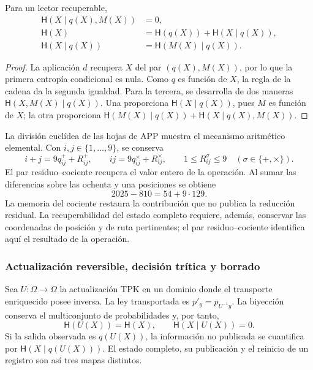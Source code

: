 \begin{proposition}
Para un lector recuperable,
\begin{align}
 \mathsf H(X\mid q(X),M(X))&=0,\\
 \mathsf H(X)&=\mathsf H(q(X))+\mathsf H(X\mid q(X)),\\
 \mathsf H(X\mid q(X))&=\mathsf H(M(X)\mid q(X)).
 \label{ii:eq:ii-kb-aut-fibra}
\end{align}
\end{proposition}
\begin{proof}
La aplicación \(d\) recupera \(X\) del par \((q(X),M(X))\),
por lo que la primera entropía condicional es nula. Como \(q\) es
función de \(X\), la regla de la cadena da la segunda igualdad.
Para la tercera, se desarrolla de dos maneras
\(\mathsf H(X,M(X)\mid q(X))\). Una proporciona
\(\mathsf H(X\mid q(X))\), pues \(M\) es función de \(X\);
la otra proporciona
\(\mathsf H(M(X)\mid q(X))+\mathsf H(X\mid q(X),M(X))\).
\end{proof}

La división euclídea de las hojas de APP muestra el mecanismo
aritmético elemental. Con \(i,j\in\{1,\ldots,9\}\), se conserva
\[
 i+j=9q^+_{ij}+R^+_{ij},\qquad
 ij=9q^\times_{ij}+R^\times_{ij},\qquad
 1\leq R^\sigma_{ij}\leq9\quad(\sigma\in\{+,\times\}).
\]
El par residuo--cociente recupera el valor entero de la operación.
Al sumar las diferencias sobre las ochenta y una posiciones se obtiene
\[
 2025-810=54+9\cdot129.
\]
La memoria del cociente restaura la contribución que no publica la
reducción residual. La recuperabilidad del estado completo requiere,
además, conservar las coordenadas de posición y de ruta pertinentes;
el par residuo--cociente identifica aquí el resultado de la operación.

\subsubsection{Actualización reversible, decisión trítica y borrado}

Sea \(U:\Omega\to\Omega\) la actualización TPK en un dominio donde
el transporte enriquecido posee inversa. La ley transportada es
\(p'_y=p_{U^{-1}y}\). La biyección conserva el multiconjunto de
probabilidades y, por tanto,
\begin{equation}
 \mathsf H(U(X))=\mathsf H(X),\qquad
 \mathsf H(X\mid U(X))=0.
 \label{ii:eq:ii-kb-aut-reversible}
\end{equation}
Si la salida observada es \(q(U(X))\), la información no publicada
se cuantifica por \(\mathsf H(X\mid q(U(X)))\). El estado completo,
su publicación y el reinicio de un registro son así tres mapas distintos.


